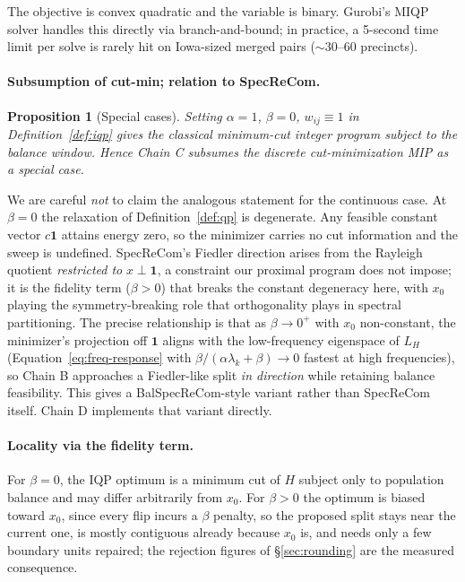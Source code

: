\documentclass[11pt]{article}
\newtheorem{proposition}{Proposition}[section]
\begin{document}
The objective is convex quadratic and the variable is binary.
Gurobi's MIQP solver handles this directly via branch-and-bound; in
practice, a 5-second time limit per solve is rarely hit on Iowa-sized
merged pairs ($\sim 30$--$60$ precincts).

\paragraph{Subsumption of cut-min; relation to SpecReCom.}\label{sec:iqp-subsumption}

\begin{proposition}[Special cases]\label{prop:iqp-special-cases}
Setting $\alpha = 1$, $\beta = 0$, $w_{ij} \equiv 1$ in
Definition~\ref{def:iqp} gives the classical minimum-cut integer
program subject to the balance window. Hence Chain C subsumes
the discrete cut-minimization MIP as a special case.
\end{proposition}

We are careful \emph{not} to claim the analogous statement for the
continuous case. At $\beta = 0$ the relaxation of
Definition~\ref{def:qp} is degenerate. Any feasible constant vector
$c\mathbf{1}$ attains energy zero, so the minimizer carries no cut
information and the sweep is undefined. SpecReCom's Fiedler direction
arises from the Rayleigh quotient \emph{restricted to}
$x \perp \mathbf{1}$, a constraint our proximal program does not
impose; it is the fidelity term ($\beta > 0$) that breaks the constant
degeneracy here, with $x_0$ playing the symmetry-breaking role that
orthogonality plays in spectral partitioning. The precise relationship
is that as $\beta \to 0^+$ with $x_0$ non-constant, the minimizer's
projection off $\mathbf{1}$ aligns with the low-frequency eigenspace
of $L_H$ (Equation~\eqref{eq:freq-response} with
$\beta/(\alpha\lambda_k + \beta) \to 0$ fastest at high frequencies),
so Chain B approaches a Fiedler-like split \emph{in direction} while
retaining balance feasibility. This gives a BalSpecReCom-style variant rather
than SpecReCom itself. Chain D implements that variant directly.

\paragraph{Locality via the fidelity term.}\label{sec:iqp-locality}

For $\beta = 0$, the IQP optimum is a minimum cut of $H$ subject only
to population balance and may differ arbitrarily from $x_0$. For
$\beta > 0$ the optimum is biased toward $x_0$, since every flip
incurs a $\beta$ penalty, so the proposed split stays near the current
one, is mostly contiguous already because $x_0$ is, and needs only a
few boundary units repaired; the rejection figures of
\S\ref{sec:rounding} are the measured consequence.
\end{document}
